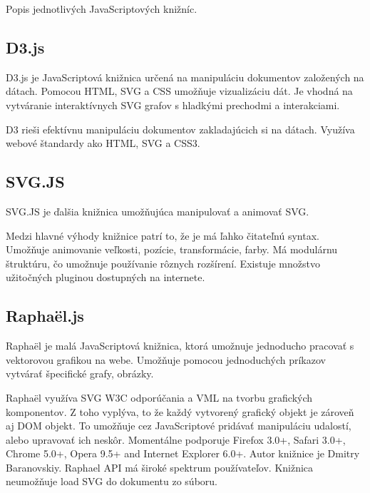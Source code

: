 Popis jednotlivých JavaScriptových knižníc.



\subsection{D3.js}

D3.js je JavaScriptová knižnica určená na manipuláciu dokumentov založených na dátach. Pomocou \acs{HTML}, \acs{SVG} a \acs{CSS} umožňuje vizualizáciu dát.
Je vhodná na vytváranie interaktívnych SVG grafov s hladkými prechodmi a interakciami. 

D3 rieši efektívnu manipuláciu dokumentov zakladajúcich si na dátach. Využíva webové štandardy ako \acs{HTML}, \acs{SVG} a \acs{CSS}3. \cite{d3js}


\subsection{SVG.JS}

SVG.JS je ďalšia knižnica umožňujúca manipulovať a animovať SVG.

Medzi hlavné výhody knižnice patrí to, že je má ľahko čitateľnú syntax. Umožňuje animovanie veľkosti, pozície, transformácie, farby. Má modulárnu štruktúru, čo umožnuje používanie rôznych rozšírení. Existuje množstvo užitočných pluginou dostupných na internete. \cite{svgjs}



\subsection{Raphaël.js}

Raphaël je malá JavaScriptová knižnica, ktorá umožnuje jednoducho pracovať s vektorovou grafikou na webe. Umožňuje pomocou jednoduchých príkazov vytvárať špecifické grafy, obrázky. 

Raphaël využíva \acs{SVG} \acs{W3C} odporúčania a \acs{VML} na tvorbu grafických komponentov. Z toho vyplýva, to že každý vytvorený grafický objekt je zároveň aj DOM objekt. To umožňuje cez JavaScriptové pridávať manipuláciu udalostí, alebo upravovať ich neskôr.
Momentálne podporuje Firefox 3.0+, Safari 3.0+, Chrome 5.0+, Opera 9.5+ and Internet Explorer 6.0+.\cite{Raphael}
Autor knižnice je Dmitry Baranovskiy. Raphael API má široké spektrum používateľov. 
Knižnica neumožňuje load SVG do dokumentu zo súboru. 



